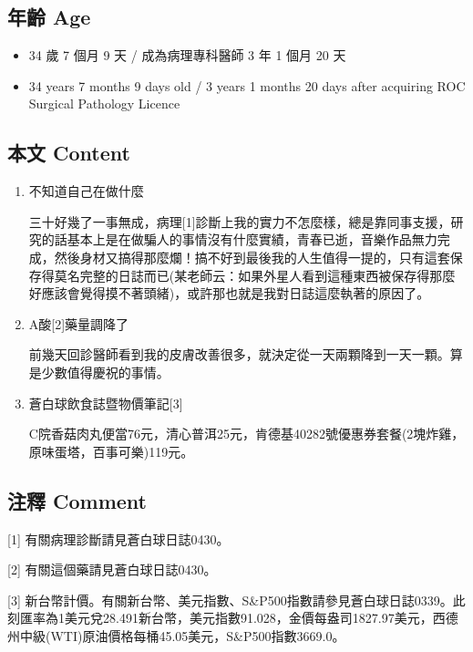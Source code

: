 \documentclass[a5paper, 11pt
]{book}
\providecommand{\tightlist}{%
  \setlength{\itemsep}{0pt}\setlength{\parskip}{0pt}}
\begin{document}
\hypertarget{ux5e74ux9f61-age-1}{%
\subsection{年齡 Age}\label{ux5e74ux9f61-age-1}}

\begin{itemize}
\tightlist
\item
  34 歲 7 個月 9 天 / 成為病理專科醫師 3 年 1 個月 20 天
\item
  34 years 7 months 9 days old / 3 years 1 months 20 days after
  acquiring ROC Surgical Pathology Licence
\end{itemize}

\hypertarget{ux672cux6587-content-1}{%
\subsection{本文 Content}\label{ux672cux6587-content-1}}

\begin{enumerate}
\def\labelenumi{\arabic{enumi}.}
\item
  不知道自己在做什麼

  三十好幾了一事無成，病理{[}1{]}診斷上我的實力不怎麼樣，總是靠同事支援，研究的話基本上是在做騙人的事情沒有什麼實績，青春已逝，音樂作品無力完成，然後身材又搞得那麼爛！搞不好到最後我的人生值得一提的，只有這套保存得莫名完整的日誌而已(某老師云：如果外星人看到這種東西被保存得那麼好應該會覺得摸不著頭緒)，或許那也就是我對日誌這麼執著的原因了。
\item
  A酸{[}2{]}藥量調降了

  前幾天回診醫師看到我的皮膚改善很多，就決定從一天兩顆降到一天一顆。算是少數值得慶祝的事情。
\item
  蒼白球飲食誌暨物價筆記{[}3{]}

  C院香菇肉丸便當76元，清心普洱25元，肯德基40282號優惠券套餐(2塊炸雞，原味蛋塔，百事可樂)119元。
\end{enumerate}

\hypertarget{ux6ce8ux91cb-comment-1}{%
\subsection{注釋 Comment}\label{ux6ce8ux91cb-comment-1}}

{[}1{]} 有關病理診斷請見蒼白球日誌0430。

{[}2{]} 有關這個藥請見蒼白球日誌0430。

{[}3{]}
新台幣計價。有關新台幣、美元指數、S\&P500指數請參見蒼白球日誌0339。此刻匯率為1美元兌28.491新台幣，美元指數91.028，金價每盎司1827.97美元，西德州中級(WTI)原油價格每桶45.05美元，S\&P500指數3669.0。
\end{document}
